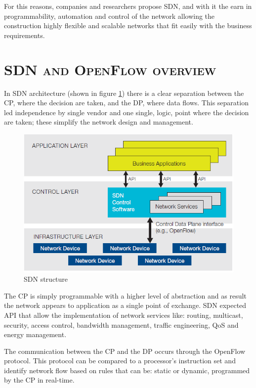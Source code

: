 For this reasons, companies and researchers propose \ac{SDN}, and with it the earn in programmability, automation and control of the network allowing the construction highly flexible and scalable networks that fit easily with the business requirements.

\section*{\small \textsc{\ac{SDN} and OpenFlow overview}}
In \ac{SDN} architecture (shown in figure \ref{fig:sdn-and-openflow-overview:sdn-structure}) there is a clear separation between the \ac{CP}, where the decision are taken, and the \ac{DP}, where data flows. This separation led independence by single vendor and one single, logic, point where the decision are taken; these simplify the network design and management.

\begin{figure}
\centering
\includegraphics[scale=0.4]{Introduction/Image/SDNStructure.png}
\caption{\ac{SDN} structure}
\label{fig:sdn-and-openflow-overview:sdn-structure}
\end{figure}

The \ac{CP} is simply programmable with a higher level of abstraction and as result the network appears to application as a single point of exchange.
\ac{SDN} expected \ac{API} that allow the implementation of network services like: routing, multicast, security, access control, bandwidth management, traffic engineering, \ac{QoS} and energy management.

The communication between the \ac{CP} and the \ac{DP} occurs through the OpenFlow protocol. This protocol can be compared to a processor's instruction set and identify network flow based on rules that can be: static or dynamic, programmed by the \ac{CP} in real-time.

